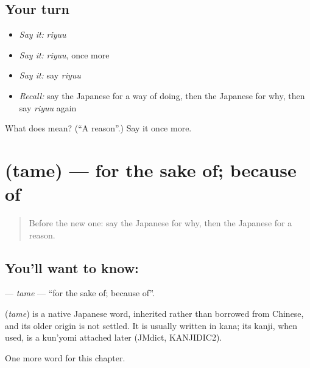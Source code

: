 \subsection*{Your turn}
\begin{itemize}
\raggedright
  \item \emph{Say it:} \emph{riyuu}
  \item \emph{Say it:} \emph{riyuu}, once more
  \item \emph{Say it:} say \emph{riyuu}
  \item \emph{Recall:} say the Japanese for a way of doing, then the Japanese for why, then say \emph{riyuu} again
\end{itemize}

\begin{tcolorbox}[breakable,colback=teal!4,colframe=teal!35!black,title={Before you move on}]
What does  mean? (\textquotedblleft{}A reason\textquotedblright{}.) Say it once more.
\end{tcolorbox}
\section[\texorpdfstring{\ja{ため} (tame)}{ため (tame)}]{ (tame) — for the sake of; because of}

\label{lesson:JA-C98-tame}



\begin{quote}
Before the new one: say the Japanese for why, then the Japanese for a reason.
\end{quote}

\subsection*{You'll want to know: }
\textbf{} — \emph{tame} — \textquotedblleft{}for the sake of; because of\textquotedblright{}.

\begin{cousinweb}
\textbf{} (\emph{tame}) is a native Japanese word, inherited rather than borrowed from Chinese, and its older origin is not settled. It is usually written in kana; its kanji, when used, is a kun'yomi attached later (JMdict, KANJIDIC2).
\end{cousinweb}

\begin{grammarlens}[title={What you've built}]
One more word for this chapter.
\end{grammarlens}

